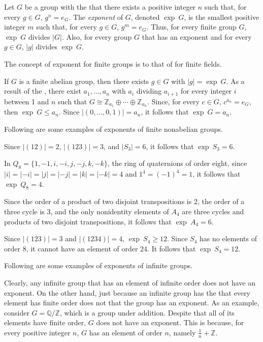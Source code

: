 \documentclass[12pt]{article}
\begin{document}
Let $G$ be a group with the  that there exists a positive integer $n$ such that, for every $g \in G$, $g^n=e_G$.  The {\sl exponent} of $G$, denoted $\operatorname{exp}~G$, is the smallest positive integer $m$ such that, for every $g \in G$, $g^m=e_G$.  Thus, for every finite group $G$, $\operatorname{exp}~G$ divides $|G|$.  Also, for every group $G$ that has an exponent and for every $g \in G$, $|g|$ divides $\operatorname{exp}~G$.

The concept of exponent for finite groups is  to that of  for finite fields.

If $G$ is a finite abelian group, then there exists $g \in G$ with $|g|=\operatorname{exp}~G$.  As a result of the , there exist $a_1, \ldots , a_n$ with $a_i$ dividing $a_{i+1}$ for every integer $i$ between 1 and $n$ such that $G \cong {\mathbb Z}_{a_1} \oplus \cdots \oplus {\mathbb Z}_{a_n}$.  Since, for every $c \in G$, $c^{a_n}=e_G$, then $\operatorname{exp}~G \le a_n$.  Since $|(0, \ldots , 0, 1)|=a_n$, it follows that $\operatorname{exp}~G=a_n$.

Following are some examples of exponents of finite nonabelian groups.

Since $|(1 2)|=2$, $|(1 2 3)|=3$, and $|S_3|=6$, it follows that $\operatorname{exp}~S_3=6$.

In $Q_8=\{1, -1, i, -i, j, -j, k, -k\}$, the ring of quaternions of order eight, since $|i|=|-i|=|j|=|-j|=|k|=|-k|=4$ and $1^4=(-1)^4=1$, it follows that $\operatorname{exp}~Q_8=4$.

Since the order of a product of two disjoint transpositions is 2, the order of a three cycle is 3, and the only nonidentity elements of $A_4$ are three cycles and products of two disjoint transpositions, it follows that $\operatorname{exp}~A_4=6$.

Since $|(1 2 3)|=3$ and $|(1 2 3 4)|=4$, $\operatorname{exp}~S_4 \ge 12$.  Since $S_4$ has no elements of order 8, it cannot have an element of order 24.  It follows that $\operatorname{exp}~S_4=12$.

Following are some examples of exponents of infinite groups.

Clearly, any infinite group that has an element of infinite order does not have an exponent.  On the other hand, just because an infinite group has the  that every element has finite order does not  that the group has an exponent.  As an example, consider $G=\mathbb{Q}/\mathbb{Z}$, which is a group under addition.  Despite that all of its elements have finite order, $G$ does not have an exponent.  This is because, for every positive integer $n$, $G$ has an element of order $n$, namely $\displaystyle \frac{1}{n}+\mathbb{Z}$.
\end{document}
